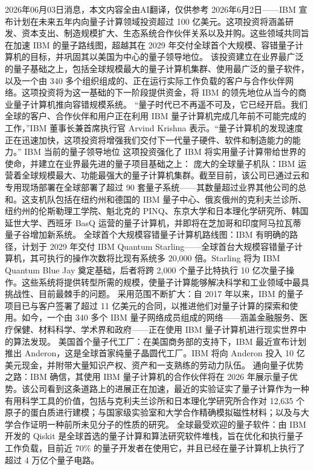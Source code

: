 \documentclass[12pt,a4paper]{ctexart}
\begin{document}
2026年06月03日消息，本文内容全由AI翻译，仅供参考
2026年6月2日——IBM 宣布计划在未来五年内向量子计算领域投资超过 100 亿美元。这项投资将涵盖研发、资本支出、制造规模扩大、生态系统合作伙伴关系以及并购。这些领域共同旨在加速 IBM 的量子路线图，超越其在 2029 年交付全球首个大规模、容错量子计算机的目标，并巩固其以美国为中心的量子领导地位。
该投资建立在业界最广泛的量子基础之上，包括全球规模最大的量子计算机集群、使用最广泛的量子软件，以及一个由 340 多个组织组成的、正在运行实际工作负载的客户与合作伙伴网络。这项投资将为这一基础的下一阶段提供资金，将 IBM 的领先地位从当今的商业量子计算机推向容错规模系统。
“量子时代已不再遥不可及，它已经开启。我们全球的客户、合作伙伴和用户正在利用 IBM 量子计算机完成几年前不可能完成的工作，”IBM 董事长兼首席执行官 Arvind Krishna 表示。“量子计算机的发现速度正在迅速加快，这项投资将增强我们交付下一代量子硬件、软件和制造能力的能力。”
IBM 当前的量子领导地位
这项投资强化了 IBM 将实用量子计算带给世界的使命，并建立在业界最先进的量子项目基础之上：
庞大的全球量子机队：IBM 运营着全球规模最大、功能最强大的量子计算机集群。截至目前，该公司已通过云和专用现场部署在全球部署了超过 90 套量子系统——其数量超过业界其他公司的总和。这支机队包括在纽约州和德国的 IBM 量子中心、俄亥俄州的克利夫兰诊所、纽约州的伦斯勒理工学院、魁北克的 PINQ、东京大学和日本理化学研究所、韩国延世大学、西班牙 BasQ 运营的量子计算机，并即将在芝加哥和印度阿马拉瓦蒂量子谷增加新系统。
全球首个大规模容错量子计算机路线图：IBM 有明确的路径，计划于 2029 年交付 IBM Quantum Starling——全球首台大规模容错量子计算机，其可执行的操作次数将比现有系统多 20,000 倍。Starling 将为 IBM Quantum Blue Jay 奠定基础，后者将跨 2,000 个量子比特执行 10 亿次量子操作。这些系统将提供转型所需的规模，使量子计算能够解决科学和工业领域中最具挑战性、目前最棘手的问题。
采用范围不断扩大：自 2017 年以来，IBM 的量子项目已与客户签署了超过 11 亿美元的合同，以推进他们对量子计算的探索和使用。如今，一个由 340 多个 IBM 量子网络成员组成的网络——涵盖金融服务、医疗保健、材料科学、学术界和政府——正在使用 IBM 量子计算机进行现实世界中的算法发现。
美国首个量子代工厂：在美国商务部的支持下，IBM 最近宣布计划推出 Anderon，这是全球首家纯量子晶圆代工厂。IBM 将向 Anderon 投入 10 亿美元现金，并附带大量知识产权、资产和一支熟练的劳动力队伍。
通向量子优势之路：IBM 确信，其使用 IBM 量子计算机的合作伙伴将在 2026 年展示量子优势。该公司看到这条道路上的进展正在加速，最近的实验证实了量子计算作为一种有用科学工具的价值，包括与克利夫兰诊所和日本理化学研究所合作对 12,635 个原子的蛋白质进行建模；与国家级实验室和大学合作精确模拟磁性材料；以及与大学合作证明一种前所未见分子的性质的研究。
全球最受欢迎的量子软件：由 IBM 开发的 Qiskit 是全球首选的量子计算和算法研究软件堆栈，旨在优化和执行量子工作负载，目前近 70\% 的量子开发者在使用它，并且已经在量子计算机上执行了超过 4 万亿个量子电路。
\end{document}
